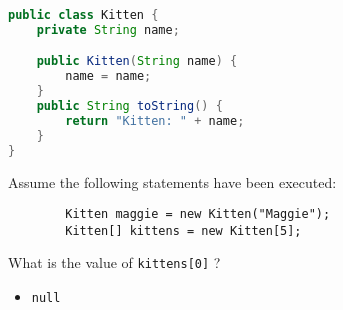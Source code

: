 \documentclass{article}
\begin{document}
\begin{lstlisting}[language=Java]
public class Kitten {
    private String name;

    public Kitten(String name) {
        name = name;
    }
    public String toString() {
        return "Kitten: " + name;
    }
}
\end{lstlisting}

Assume the following statements have been executed:

\begin{lstlisting}
        Kitten maggie = new Kitten("Maggie");
        Kitten[] kittens = new Kitten[5];
\end{lstlisting}

What is the value of {\tt kittens[0]} ?
\begin{itemize}
\itemsep0em
\item {\tt null}
\end{itemize}
\end{document}
